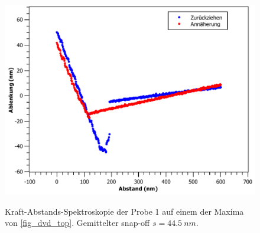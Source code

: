 \documentclass[
	a4paper,
	12pt,
	pagesize,
	ngerman
]{scrartcl}
\begin{document}
\begin{figure}[H]
{			\label{fig_dvd_ds5}}{\includegraphics[width=.49\linewidth]{images/DVD/DS5}}
			\caption{Kraft-Abstands-Spektroskopie der Probe 1 auf einem der Maxima von \cref{fig_dvd_top}. Gemittelter snap-off $s=\SI{44.5}{nm}$.} %
			\label{fig_dvd_ds}
\end{figure}
\begin{figure}[H]
			\centering

\end{figure}
\end{document}

